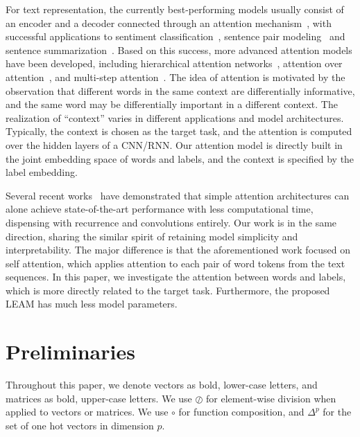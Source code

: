 \documentclass[11pt,a4paper]{article}
\begin{document}
For text representation, the currently best-performing models usually consist of an encoder and a decoder connected through an attention mechanism~\cite{vaswani2017attention,bahdanau2015neural}, with successful applications to sentiment classification~\cite{zhou2016attention}, sentence pair modeling~\cite{yin2016abcnn} and sentence summarization~\cite{rush2015neural}. Based on this success, more advanced attention models have been developed, including hierarchical attention networks~\cite{yang2016hierarchical}, attention over attention~\cite{cui2016attention}, and multi-step attention~\cite{gehring2017convolutional}.
The idea of attention is motivated by the observation that different words in the same context are differentially informative, and the same word may be differentially important in a different context. The realization of ``context'' varies in different applications and model architectures. Typically, the context is chosen as the target task, and the attention is computed over the hidden layers of a CNN/RNN. 
Our attention model is directly built in the joint embedding space of words and labels, and the context is specified by the label embedding.

Several recent works~\cite{vaswani2017attention,shen2018disan,shen2018bi} have demonstrated that simple attention architectures can alone achieve state-of-the-art performance with less computational time, dispensing with recurrence and convolutions entirely. Our work is in the same direction, sharing the similar spirit of retaining model simplicity and interpretability. The major difference is that the aforementioned work focused on self attention, which applies attention to each pair of word tokens from the text sequences. In this paper, we investigate the attention between words and labels, which is more directly related to the target task. Furthermore, the proposed LEAM has much less model parameters. 


\section{Preliminaries}
Throughout this paper, we denote vectors as bold, lower-case letters, and matrices as bold, upper-case
letters. We use $\oslash$ for element-wise division when applied to vectors or matrices. We use $\circ$ for function composition, and $\Delta^p$ for the set of one hot vectors in dimension $p$.
\end{document}

